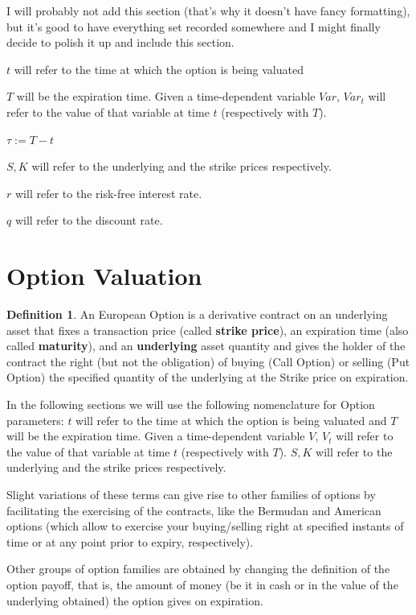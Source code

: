 \documentclass[12,twoside]{mammeTFM}
\theoremstyle{definition}
\newtheorem{definition}[thm]{Definition}
\theoremstyle{remark}
\begin{document}
I will probably not add this section (that's why it doesn't have fancy formatting), but it's good to have everything set recorded somewhere and I might finally decide to polish it up and include this section.

$t$ will refer to the time at which the option is being valuated

$T$ will be the expiration time. Given a time-dependent variable $Var$, $Var_t$ will refer to the value of that variable at time $t$ (respectively with $T$). 

$\tau := T - t$

$S, K$ will refer to the underlying and the strike prices respectively.

$r$ will refer to the risk-free interest rate.

$q$ will refer to the discount rate.

\section{Option Valuation}

\begin{definition}
An European Option is a derivative contract on an underlying asset that fixes a transaction price (called \textbf{strike price}), an expiration time (also called \textbf{maturity}), and an \textbf{underlying} asset quantity and gives the holder of the contract the right (but not the obligation) of buying (Call Option) or selling (Put Option) the specified quantity of the underlying at the Strike price on expiration.
\end{definition}

In the following sections we will use the following nomenclature for Option parameters: $t$ will refer to the time at which the option is being valuated and $T$ will be the expiration time. Given a time-dependent variable $V$, $V_t$ will refer to the value of that variable at time $t$ (respectively with $T$). $S, K$ will refer to the underlying and the strike prices respectively.

Slight variations of these terms can give rise to other families of options by facilitating the exercising of the contracts, like the Bermudan and American options (which allow to exercise your buying/selling right at specified instants of time or at any point prior to expiry, respectively).

Other groups of option families are obtained by changing the definition of the option payoff, that is, the amount of money (be it in cash or in the value of the underlying obtained) the option gives on expiration.
\end{document}
